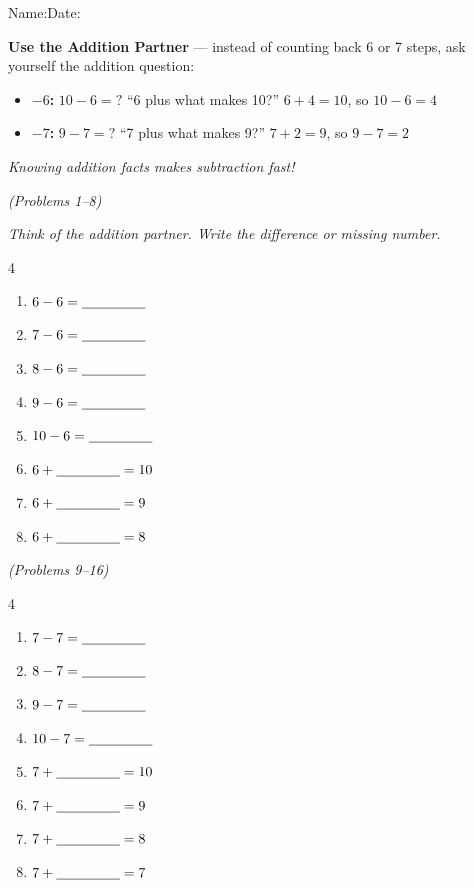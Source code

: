 \documentclass[12pt, letterpaper]{article}
\begin{document}

{\small Name:\ansblanklg \hfill Date:\ansblank}
\goldrule

\begin{instructbox}
\textbf{Use the Addition Partner} — instead of counting back 6 or 7 steps, ask yourself the addition question:
\begin{itemize}
  \item \textbf{$-6$:} \quad $10-6=?$ \;\to\; ``6 plus what makes 10?'' \quad $6+4=10$, so $10-6=4$
  \item \textbf{$-7$:} \quad $9-7=?$ \;\to\; ``7 plus what makes 9?'' \quad $7+2=9$, so $9-7=2$
\end{itemize}
\textit{Knowing addition facts makes subtraction fast!}
\end{instructbox}

\bigskip
{} \hfill \textit{(Problems 1–8)}

\medskip\noindent\textit{Think of the addition partner. Write the difference or missing number.}

\bigskip
\begin{multicols}{4}
\begin{enumerate}[leftmargin=*,label=\textbf{\arabic*.},itemsep=10pt]
  \item $6-6=\underline{\hspace{1.6cm}}$
  \item $7-6=\underline{\hspace{1.6cm}}$
  \item $8-6=\underline{\hspace{1.6cm}}$
  \item $9-6=\underline{\hspace{1.6cm}}$
  \item $10-6=\underline{\hspace{1.6cm}}$
  \item $6+\underline{\hspace{1.6cm}}=10$
  \item $6+\underline{\hspace{1.6cm}}=9$
  \item $6+\underline{\hspace{1.6cm}}=8$
\end{enumerate}
\end{multicols}

\bigskip\bigskip
{} \hfill \textit{(Problems 9–16)}

\bigskip
\begin{multicols}{4}
\begin{enumerate}[leftmargin=*,label=\textbf{\arabic*.},itemsep=10pt,start=9]
  \item $7-7=\underline{\hspace{1.6cm}}$
  \item $8-7=\underline{\hspace{1.6cm}}$
  \item $9-7=\underline{\hspace{1.6cm}}$
  \item $10-7=\underline{\hspace{1.6cm}}$
  \item $7+\underline{\hspace{1.6cm}}=10$
  \item $7+\underline{\hspace{1.6cm}}=9$
  \item $7+\underline{\hspace{1.6cm}}=8$
  \item $7+\underline{\hspace{1.6cm}}=7$
\end{enumerate}
\end{multicols}
\end{document}

